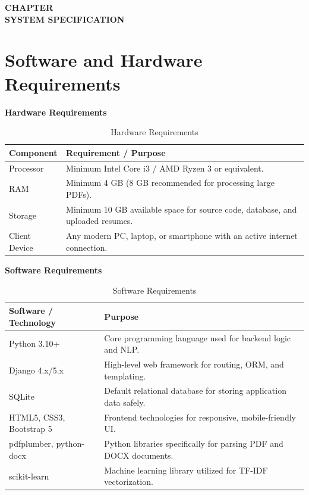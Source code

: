 \documentclass[12pt,a4paper]{report}
\newcommand{\chaptertitlepage}[1]{%
\cleardoublepage
\thispagestyle{empty}
\null
\vfill
\begin{center}
{\fontsize{16pt}{18pt}\selectfont\bfseries
CHAPTER \thechapter}\\[0.5cm]
{\fontsize{16pt}{18pt}\selectfont\bfseries
#1}
\end{center}
\vfill
\null
\clearpage
}
\begin{document}
\chaptertitlepage{SYSTEM SPECIFICATION}
\section{Software and Hardware Requirements}

\textbf{Hardware Requirements}
\begin{table}[htbp]
\centering
\begin{tabular}{|p{6.5cm}|p{7.5cm}|}
\hline
\textbf{Component} & \textbf{Requirement / Purpose} \\ \hline
Processor & Minimum Intel Core i3 / AMD Ryzen 3 or equivalent. \\ \hline
RAM & Minimum 4 GB (8 GB recommended for processing large PDFs). \\ \hline
Storage & Minimum 10 GB available space for source code, database, and uploaded resumes. \\ \hline
Client Device & Any modern PC, laptop, or smartphone with an active internet connection. \\ \hline
\end{tabular}
\caption{Hardware Requirements}
\end{table}

\textbf{Software Requirements}
\begin{table}[htbp]
\centering
\begin{tabular}{|p{5.5cm}|p{7.5cm}|}
\hline
\textbf{Software / Technology} & \textbf{Purpose} \\ \hline
Python 3.10+ & Core programming language used for backend logic and NLP. \\ \hline
Django 4.x/5.x & High-level web framework for routing, ORM, and templating. \\ \hline
SQLite & Default relational database for storing application data safely. \\ \hline
HTML5, CSS3, Bootstrap 5 & Frontend technologies for responsive, mobile-friendly UI. \\ \hline
pdfplumber, python-docx & Python libraries specifically for parsing PDF and DOCX documents. \\ \hline
scikit-learn & Machine learning library utilized for TF-IDF vectorization. \\ \hline
\end{tabular}
\caption{Software Requirements}
\end{table}
\end{document}
